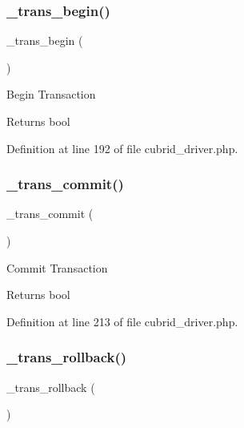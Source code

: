 \subsubsection{\texorpdfstring{\_trans\_begin()}{\_trans\_begin()}}
{\footnotesize\ttfamily \+\_\+trans\+\_\+begin (\begin{DoxyParamCaption}{ }\end{DoxyParamCaption})\hspace{0.3cm}{\ttfamily [protected]}}

Begin Transaction

\begin{DoxyReturn}{Returns}
bool 
\end{DoxyReturn}


Definition at line 192 of file cubrid\+\_\+driver.\+php.

\mbox{\label{class_c_i___d_b__cubrid__driver_a6fe7f373e0b11cfae23a5f41c0b35dda}} 
\subsubsection{\texorpdfstring{\_trans\_commit()}{\_trans\_commit()}}
{\footnotesize\ttfamily \+\_\+trans\+\_\+commit (\begin{DoxyParamCaption}{ }\end{DoxyParamCaption})\hspace{0.3cm}{\ttfamily [protected]}}

Commit Transaction

\begin{DoxyReturn}{Returns}
bool 
\end{DoxyReturn}


Definition at line 213 of file cubrid\+\_\+driver.\+php.

\mbox{\label{class_c_i___d_b__cubrid__driver_ad49a116b0776c26b53114c9093fd102a}} 
\subsubsection{\texorpdfstring{\_trans\_rollback()}{\_trans\_rollback()}}
{\footnotesize\ttfamily \+\_\+trans\+\_\+rollback (\begin{DoxyParamCaption}{ }\end{DoxyParamCaption})\hspace{0.3cm}{\ttfamily [protected]}}

